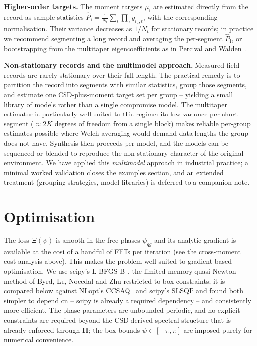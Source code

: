 \documentclass[10pt,a4paper]{article}
\numberwithin{equation}{section}
\newcommand{\mat}[1]{\left(#1\right)}
\begin{document}
\textbf{Higher-order targets.} The moment targets $\mu_\mathbf{i}$ are estimated directly from the record as sample statistics $\hat P_\mathbf{i} = \frac{1}{N_t}\sum_t \prod_a y_{i_a, t}$, with the corresponding normalisation. Their variance decreases as $1/N_t$ for stationary records; in practice we recommend segmenting a long record and averaging the per-segment $\hat P_\mathbf{i}$, or bootstrapping from the multitaper eigencoefficients as in Percival and Walden~\cite{percival_walden_1993}.

\textbf{Non-stationary records and the multimodel approach.} Measured field records are rarely stationary over their full length. The practical remedy is to partition the record into segments with similar statistics, group those segments, and estimate one CSD-plus-moment target set per group -- yielding a small library of models rather than a single compromise model. The multitaper estimator is particularly well suited to this regime: its low variance per short segment (${\approx}2K$ degrees of freedom from a single block) makes reliable per-group estimates possible where Welch averaging would demand data lengths the group does not have. Synthesis then proceeds per model, and the models can be sequenced or blended to reproduce the non-stationary character of the original environment. We have applied this \emph{multimodel} approach in industrial practice; a minimal worked validation closes the examples section, and an extended treatment (grouping strategies, model libraries) is deferred to a companion note.

\section*{Optimisation}
The loss $\Xi\mat{\psi}$ is smooth in the free phases $\psi_{q g}$ and its analytic gradient is available at the cost of a handful of FFTs per iteration (see the cross-moment cost analysis above). This makes the problem well-suited to gradient-based optimisation. We use scipy's L-BFGS-B~\cite{byrd1995lbfgsb,virtanen2020scipy}, the limited-memory quasi-Newton method of Byrd, Lu, Nocedal and Zhu restricted to box constraints; it is compared below against NLopt's CCSAQ~\cite{svanberg2002ccsaq,johnson_nlopt} and scipy's SLSQP and found both simpler to depend on -- scipy is already a required dependency -- and consistently more efficient. The phase parameters are unbounded periodic, and no explicit constraints are required beyond the CSD-derived spectral structure that is already enforced through $\mathbf{H}$; the box bounds $\psi\in[-\pi,\pi]$ are imposed purely for numerical convenience.
\end{document}
